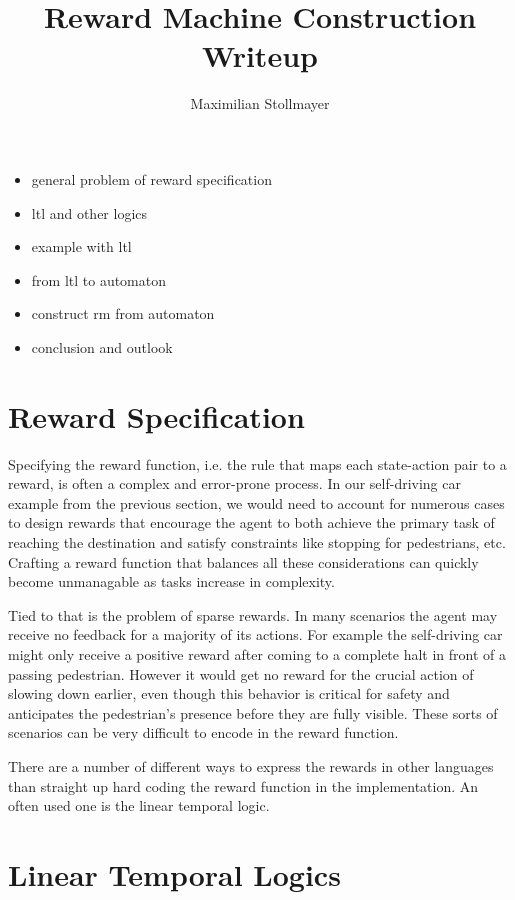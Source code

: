 \documentclass[12pt, a4paper]{article}
\title{Reward Machine Construction Writeup}
\author{Maximilian Stollmayer}
\date{}
\theoremstyle{plain}
\begin{document}
\maketitle

\begin{itemize}
	\item general problem of reward specification
	\item ltl and other logics
	\item example with ltl
	\item from ltl to automaton
	\item construct rm from automaton
	\item conclusion and outlook
\end{itemize}

\section*{Reward Specification}

Specifying the reward function, i.e. the rule that maps each state-action pair to a reward, is often a complex and error-prone process. In our self-driving car example from the previous section, we would need to account for numerous cases to design rewards that encourage the agent to both achieve the primary task of reaching the destination and satisfy constraints like stopping for pedestrians, etc. Crafting a reward function that balances all these considerations can quickly become unmanagable as tasks increase in complexity.

Tied to that is the problem of sparse rewards. In many scenarios the agent may receive no feedback for a majority of its actions. For example the self-driving car might only receive a positive reward after coming to a complete halt in front of a passing pedestrian. However it would get no reward for the crucial action of slowing down earlier, even though this behavior is critical for safety and anticipates the pedestrian's presence before they are fully visible. These sorts of scenarios can be very difficult to encode in the reward function.

There are a number of different ways to express the rewards in other languages than straight up hard coding the reward function in the implementation. An often used one is the linear temporal logic.

\section*{Linear Temporal Logics}
\end{document}
